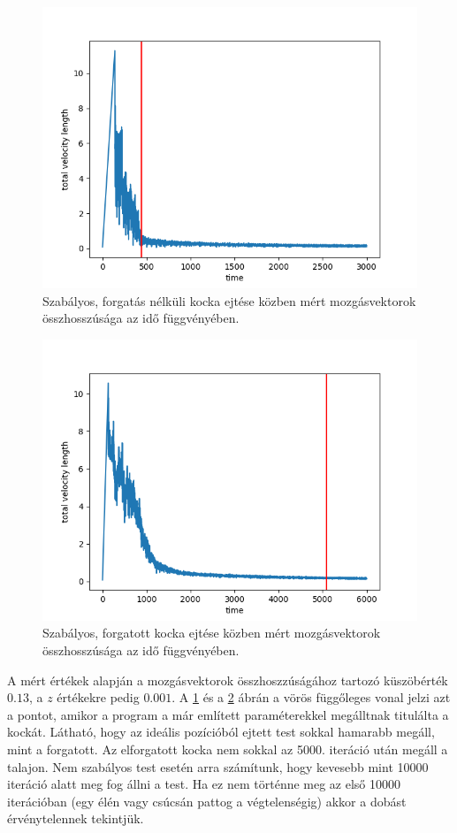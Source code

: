 \begin{figure}[h!]
	\centering
	\includegraphics[scale=0.7]{images/cube_normal_3000.png}
	\caption{Szabályos, forgatás nélküli kocka ejtése közben mért mozgásvektorok összhosszúsága az idő függvényében.}
	\label{fig:cn3000}
\end{figure}
\begin{figure}[h!]
	\centering
	\includegraphics[scale=0.7]{images/cube_rotated_6000.png}
	\caption{Szabályos, forgatott kocka ejtése közben mért mozgásvektorok összhosszúsága az idő függvényében.}
	\label{fig:cr6000}
\end{figure}
A mért értékek alapján a mozgásvektorok összhoszzúságához tartozó küszöbérték $0.13$, a $z$ értékekre pedig $0.001$.
A \ref{fig:cn3000} és a \ref{fig:cr6000} ábrán a vörös függőleges vonal jelzi azt a pontot, amikor a program a már említett paraméterekkel megálltnak titulálta a kockát.
Látható, hogy az ideális pozícióból ejtett test sokkal hamarabb megáll, mint a forgatott.
Az elforgatott kocka nem sokkal az 5000. iteráció után megáll a talajon.
Nem szabályos test esetén arra számítunk, hogy kevesebb mint 10000 iteráció alatt meg fog állni a test.
Ha ez nem történne meg az első 10000 iterációban (egy élén vagy csúcsán pattog a végtelenségig) akkor a dobást érvénytelennek tekintjük.

